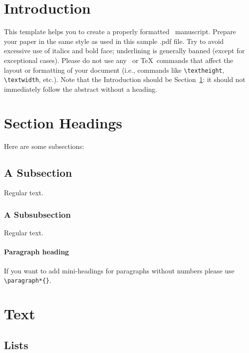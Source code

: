 \documentclass[rbe,wwwview]{econbr}
\begin{document}

\section{Introduction}\label{s1}

This template helps you to create a properly formatted \LaTeXe\ manuscript. Prepare your paper in the same style as used in this sample .pdf file. Try to avoid excessive use of italics and bold face; underlining is generally banned (except for exceptional cases). Please do not use any \LaTeXe\ or \TeX\ commands that affect the layout or formatting of your document (i.e., commands like \verb|\textheight|, \verb|\textwidth|, etc.). Note that the Introduction should be Section~\ref{s1}: it should not immediately follow the abstract without a heading.

\section{Section Headings}
Here are some subsections:
\subsection{A Subsection}
Regular text.
\subsubsection{A Subsubsection}
Regular text.

\paragraph*{Paragraph heading} If you want to add mini-headings for paragraphs without numbers please use \verb|\paragraph*{}|.

\section{Text}

\subsection{Lists}
\end{document}
